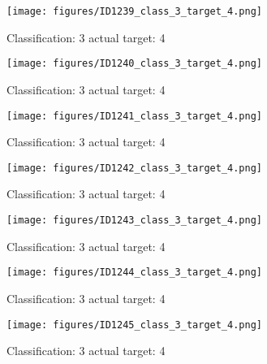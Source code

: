\begin{figure}[h!]
\begin{center}
\texttt{[image: figures/ID1239\_class\_3\_target\_4.png]}
\end{center}
\caption{ Classification: 3 actual target: 4}
\label{fig:ID1239_class_3_target_4}
\end{figure}
\begin{figure}[h!]
\begin{center}
\texttt{[image: figures/ID1240\_class\_3\_target\_4.png]}
\end{center}
\caption{ Classification: 3 actual target: 4}
\label{fig:ID1240_class_3_target_4}
\end{figure}
\begin{figure}[h!]
\begin{center}
\texttt{[image: figures/ID1241\_class\_3\_target\_4.png]}
\end{center}
\caption{ Classification: 3 actual target: 4}
\label{fig:ID1241_class_3_target_4}
\end{figure}
\begin{figure}[h!]
\begin{center}
\texttt{[image: figures/ID1242\_class\_3\_target\_4.png]}
\end{center}
\caption{ Classification: 3 actual target: 4}
\label{fig:ID1242_class_3_target_4}
\end{figure}
\begin{figure}[h!]
\begin{center}
\texttt{[image: figures/ID1243\_class\_3\_target\_4.png]}
\end{center}
\caption{ Classification: 3 actual target: 4}
\label{fig:ID1243_class_3_target_4}
\end{figure}
\begin{figure}[h!]
\begin{center}
\texttt{[image: figures/ID1244\_class\_3\_target\_4.png]}
\end{center}
\caption{ Classification: 3 actual target: 4}
\label{fig:ID1244_class_3_target_4}
\end{figure}
\begin{figure}[h!]
\begin{center}
\texttt{[image: figures/ID1245\_class\_3\_target\_4.png]}
\end{center}
\caption{ Classification: 3 actual target: 4}
\label{fig:ID1245_class_3_target_4}
\end{figure}
